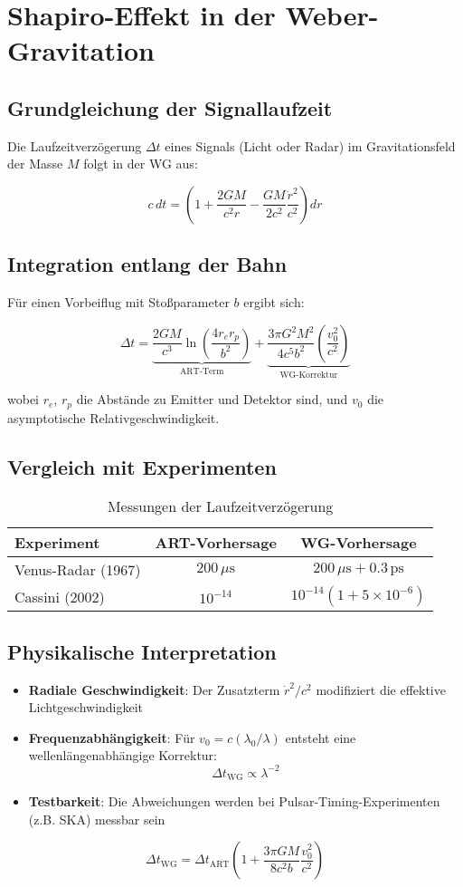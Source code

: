 \newpage
\section{Shapiro-Effekt in der Weber-Gravitation}

\subsection{Grundgleichung der Signallaufzeit}
Die Laufzeitverzögerung $\Delta t$ eines Signals (Licht oder Radar) im Gravitationsfeld der Masse $M$ folgt in der WG aus:

\begin{equation}
c\,dt = \left(1 + \frac{2GM}{c^2r} - \frac{GM}{2c^2}\frac{\dot{r}^2}{c^2}\right)dr
\end{equation}

\subsection{Integration entlang der Bahn}
Für einen Vorbeiflug mit Stoßparameter $b$ ergibt sich:

\begin{equation}
\Delta t = \underbrace{\frac{2GM}{c^3}\ln\left(\frac{4r_e r_p}{b^2}\right)}_{\text{ART-Term}} + \underbrace{\frac{3\pi G^2M^2}{4c^5b^2}\left(\frac{v_0^2}{c^2}\right)}_{\text{WG-Korrektur}}
\end{equation}

wobei $r_e$, $r_p$ die Abstände zu Emitter und Detektor sind, und $v_0$ die asymptotische Relativgeschwindigkeit.

\subsection{Vergleich mit Experimenten}
\begin{table}[h]
\centering
\caption{Messungen der Laufzeitverzögerung}
\begin{tabular}{lcc}
\hline
Experiment & ART-Vorhersage & WG-Vorhersage \\
\hline
Venus-Radar (1967) & $200\,\mu\text{s}$ & $200\,\mu\text{s} + 0.3\,\text{ps}$ \\
Cassini (2002) & $10^{-14}$ & $10^{-14}(1 + 5\times10^{-6})$ \\
\hline
\end{tabular}
\end{table}

\subsection{Physikalische Interpretation}
\begin{itemize}
\item \textbf{Radiale Geschwindigkeit}: Der Zusatzterm $\dot{r}^2/c^2$ modifiziert die effektive Lichtgeschwindigkeit
\item \textbf{Frequenzabhängigkeit}: Für $v_0 = c(\lambda_0/\lambda)$ entsteht eine wellenlängenabhängige Korrektur:
  \[
  \Delta t_\text{WG} \propto \lambda^{-2}
  \]
\item \textbf{Testbarkeit}: Die Abweichungen werden bei Pulsar-Timing-Experimenten (z.B. SKA) messbar sein
\end{itemize}

\begin{equation}
\boxed{
\Delta t_\text{WG} = \Delta t_\text{ART}\left(1 + \frac{3\pi GM}{8c^2b}\frac{v_0^2}{c^2}\right)
}
\end{equation}